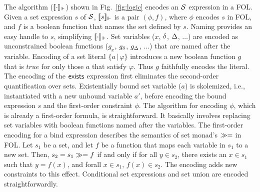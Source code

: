 The algorithm ($\llbracket \cdot \rrbracket_{\Vdash}$) shown in Fig.~\ref{fig:logic}
encodes an $\mathcal{S}$ expression in a FOL. Given a set expression $s$ of
$\mathcal{S}$, $\llbracket s \rrbracket_{\Vdash}$ is a pair $(\phi,f)$, where $\phi$ encodes $s$ in
FOL, and $f$ is a boolean function that names the set defined by $s$.
Naming provides an easy handle to $s$, simplifying $\llbracket \cdot \rrbracket_{\Vdash}$.
Set variables ($x$, $\delta$, $\Delta$, $\dots$) are encoded as
unconstrained boolean functions ($g_x$, $g_{\delta}$, $g_{\Delta}$,
$\ldots$) that are named after the variable.  Encoding of a set
literal $\{a\,|\,\varphi\}$ introduces a new boolean function $g$ that
is $true$ for only those $a$ that satisfy $\varphi$.  Thus $g$
faithfully encodes the literal. The encoding of the ${\sf exists}{}$
expression first eliminates the second-order quantification over sets.
Existentially bound set variable ($a$) is skolemized, i.e.,
instantiated with a new unbound variable $a'$, before encoding the
bound expression $s$ and the first-order constraint $\phi$. The
algorithm for encoding $\phi$, which is already a first-order formula,
is straightforward. It basically involves replacing set variables with
boolean functions named after the variables. The first-order encoding
for a bind expression describes the semantics of set monad's $\gg=$
in FOL. Let $s_1$ be a set, and let $f$ be a function that maps each
variable in $s_1$ to a new set. Then, $s_2 = s_1 \gg= f$ if and only
if for all $y\in s_2$, there exists an $x \in s_1$ such that $y =
f(x)$, and forall $x\in s_1$, $f(x)\in s_2$. The encoding adds new
constraints to this effect. Conditional set expressions and set union
are encoded straightforwardly.

